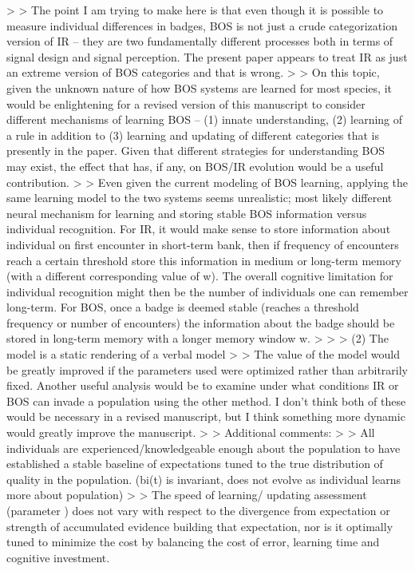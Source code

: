 >
> The point I am trying to make here is that even though it is possible to measure individual differences in badges, BOS is not just a crude categorization version of IR – they are two fundamentally different processes both in terms of signal design and signal perception. The present paper appears to treat IR as just an extreme version of BOS categories and that is wrong.
>
> On this topic, given the unknown nature of how BOS systems are learned for most species, it would be enlightening for a revised version of this manuscript to consider different mechanisms of learning BOS – (1) innate understanding, (2) learning of a rule in addition to  (3) learning and updating of different categories that is presently in the paper. Given that different strategies for understanding BOS may exist, the effect that has, if any, on BOS/IR evolution would be a useful contribution.
>
> Even given the current modeling of BOS learning, applying the same learning model to the two systems seems unrealistic; most likely different neural mechanism for learning and storing stable BOS information versus individual recognition. For IR, it would make sense to store information about individual on first encounter in short-term bank, then if frequency of encounters reach a certain threshold store this information in medium or long-term memory (with a different corresponding value of w). The overall cognitive limitation for individual recognition might then be the number of individuals one can remember long-term.  For BOS, once a badge is deemed stable (reaches a threshold frequency or number of encounters) the information about the badge should be stored in long-term memory with a longer memory window w.
>
>
> (2) The model is a static rendering of a verbal model
>
> The value of the model would be greatly improved if the parameters used were optimized rather than arbitrarily fixed. Another useful analysis would be to examine under what conditions IR or BOS can invade a population using the other method. I don’t think both of these would be necessary in a revised manuscript, but I think something more dynamic would greatly improve the manuscript.
>
> Additional comments:
>
> All individuals are experienced/knowledgeable enough about the population to have established a stable baseline of expectations tuned to the true distribution of quality in the population. (bi(t) is invariant, does not evolve as individual learns more about population)
>
> The speed of learning/ updating assessment (parameter ) does not vary with respect to the divergence from expectation or strength of accumulated evidence building that expectation, nor is it optimally tuned to minimize the cost by balancing the cost of error, learning time and cognitive investment.
